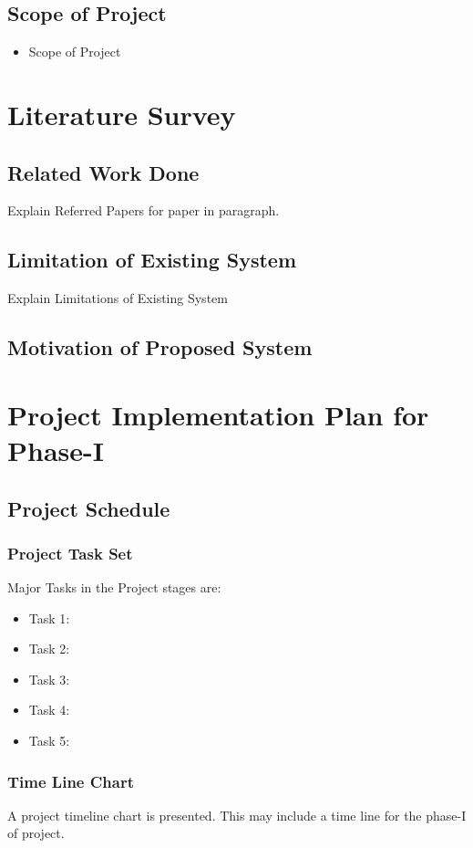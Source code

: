 \documentclass[oneside,a4paper,12pt]{report}
\begin{document}
{\section{Scope of Project}
\begin{itemize}
\item Scope of Project
\end{itemize}



\chapter{Literature Survey }
\section{Related Work Done }
\item Explain Referred Papers for paper in paragraph. 
\section{Limitation of Existing System }
\item Explain Limitations of Existing System
\section{Motivation of Proposed System }
\item


\chapter{Project Implementation Plan for Phase-I}
 \section{Project Schedule} 
 \subsection{Project Task Set}
 Major Tasks in the Project stages are:
\begin{itemize}
  \item Task 1: 
  \item Task 2: 
  \item Task 3: 
  \item Task 4: 
  \item Task 5: 
\end{itemize}

 \subsection{Time Line Chart}
 A project timeline chart is presented. This may include a time line for the phase-I of project.


}
\end{document}
